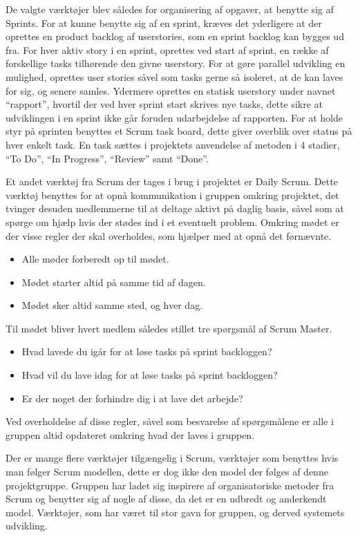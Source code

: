 De valgte værktøjer blev således for organisering af opgaver, at benytte sig af Sprints.
For at kunne benytte sig af en sprint, kræves det yderligere at der oprettes en product backlog af userstories, som en sprint backlog kan bygges ud fra.
For hver aktiv story i en sprint, oprettes ved start af sprint, en række af forskellige tasks tilhørende den givne userstory.
For at gøre parallel udvikling en mulighed, oprettes user stories såvel som tasks gerne så isoleret, at de kan laves for sig, og senere samles.
Ydermere oprettes en statisk userstory under navnet ``rapport'', hvortil der ved hver sprint start skrives nye tasks, dette sikre at udviklingen i en sprint ikke går foruden udarbejdelse af rapporten.
For at holde styr på sprinten benyttes et Scrum task board, dette giver overblik over status på hver enkelt task.
En task sættes i projektets anvendelse af metoden i 4 stadier, ``To Do'', ``In Progress'', ``Review'' samt ``Done''.

Et andet værktøj fra Scrum der tages i brug i projektet er Daily Scrum.
Dette værktøj benyttes for at opnå kommunikation i gruppen omkring projektet, det tvinger desuden medlemmerne til at deltage aktivt på daglig basis, såvel som at spørge om hjælp hvis der stødes ind i et eventuelt problem.
Omkring mødet er der visse regler der skal overholdes, som hjælper med at opnå det førnævnte.
\begin{itemize}
  \item Alle møder forberedt op til mødet.
  \item Mødet starter altid på samme tid af dagen.
  \item Mødet sker altid samme sted, og hver dag.
\end{itemize}
Til mødet bliver hvert medlem således stillet tre spørgsmål af Scrum Master.
\begin{itemize}
  \item Hvad lavede du igår for at løse tasks på sprint backloggen?
  \item Hvad vil du lave idag for at løse tasks på sprint backloggen?
  \item Er der noget der forhindre dig i at lave det arbejde?
\end{itemize}
Ved overholdelse af disse regler, såvel som besvarelse af spørgsmålene er alle i gruppen altid opdateret omkring hvad der laves i gruppen.

Der er mange flere værktøjer tilgængelig i Scrum, værktøjer som benyttes hvis man følger Scrum modellen, dette er dog ikke den model der følges af denne projektgruppe.
Gruppen har ladet sig inspirere af organisatoriske metoder fra Scrum og benytter sig af nogle af disse, da det er en udbredt og anderkendt model.
Værktøjer, som har været til stor gavn for gruppen, og derved systemets udvikling.

